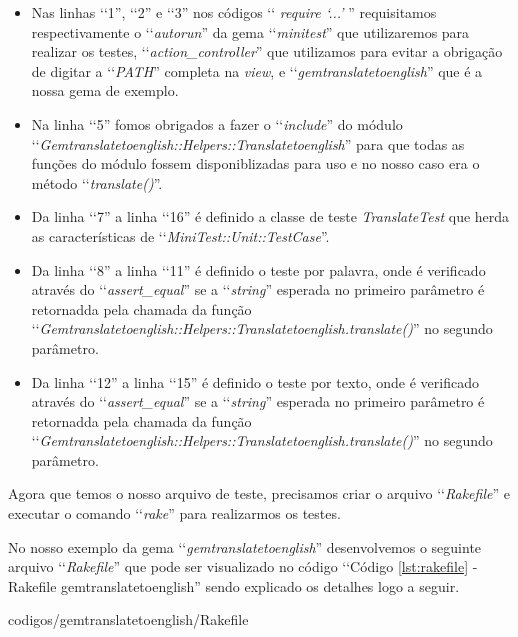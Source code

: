 \begin{itemize}

 \item Nas linhas ‘‘1'', ‘‘2'' e ‘‘3'' nos códigos ‘‘ \emph{require ‘...'} '' requisitamos respectivamente o 
 ‘‘\emph{autorun}'' da gema ‘‘\emph{minitest}'' que utilizaremos para realizar os testes, 
 ‘‘\emph{action\_controller}'' que utilizamos para evitar a obrigação de digitar a ‘‘\emph{PATH}'' completa 
 na \emph{view}, e ‘‘\emph{gemtranslatetoenglish}'' que é a nossa gema de exemplo.
 
 \item Na linha ‘‘5'' fomos obrigados a fazer o ‘‘\emph{include}'' do módulo 
 ‘‘\emph{Gemtranslatetoenglish::Helpers::Translatetoenglish}'' para que todas as funções do módulo fossem 
 disponiblizadas para uso e no nosso caso era o método ‘‘\emph{translate()}''.
 
 \item Da linha ‘‘7'' a linha ‘‘16'' é definido a classe de teste \emph{TranslateTest} que herda as 
 características de ‘‘\emph{MiniTest::Unit::TestCase}''.
 
 \item Da linha ‘‘8'' a linha ‘‘11'' é definido o teste por palavra, onde é verificado através do 
 ‘‘\emph{assert\_equal}'' se a ‘‘\emph{string}'' esperada no primeiro parâmetro é retornadda pela chamada 
 da função ‘‘\emph{Gemtranslatetoenglish::Helpers::Translatetoenglish.translate()}'' no segundo parâmetro.
  
 \item Da linha ‘‘12'' a linha ‘‘15'' é definido o teste por texto, onde é verificado através do 
 ‘‘\emph{assert\_equal}'' se a ‘‘\emph{string}'' esperada no primeiro parâmetro é retornadda pela chamada 
 da função ‘‘\emph{Gemtranslatetoenglish::Helpers::Translatetoenglish.translate()}'' no segundo parâmetro.
 
\end{itemize}

Agora que temos o nosso arquivo de teste, precisamos criar o arquivo ‘‘\emph{Rakefile}'' e executar o 
comando ‘‘\emph{rake}'' para realizarmos os testes.

No nosso exemplo da gema ‘‘\emph{gemtranslatetoenglish}'' desenvolvemos o seguinte arquivo 
‘‘\emph{Rakefile}'' que pode ser visualizado no código ‘‘Código \ref{lst:rakefile} - 
Rakefile gemtranslatetoenglish'' sendo explicado os detalhes logo a seguir.


{codigos/gemtranslatetoenglish/Rakefile}

